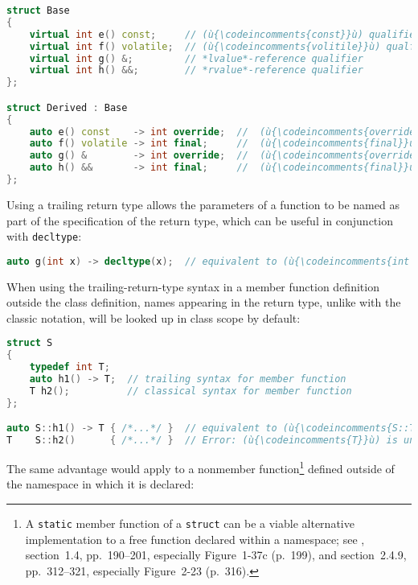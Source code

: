 \begin{lstlisting}[language=C++]
struct Base
{
    virtual int e() const;     // (ù{\codeincomments{const}}ù) qualifier
    virtual int f() volatile;  // (ù{\codeincomments{volitile}}ù) qualfier
    virtual int g() &;         // *lvalue*-reference qualifier
    virtual int h() &&;        // *rvalue*-reference qualifier
};

struct Derived : Base
{
    auto e() const    -> int override;  //  (ù{\codeincomments{override}}ù) contextual keyword
    auto f() volatile -> int final;     //  (ù{\codeincomments{final}}ù)         "        "
    auto g() &        -> int override;  //  (ù{\codeincomments{override}}ù)      "        "
    auto h() &&       -> int final;     //  (ù{\codeincomments{final}}ù)         "        "
};
\end{lstlisting}

\noindent Using a trailing return type allows the parameters of a function to be
named as part of the specification of the return type, which can be
useful in conjunction with \lstinline!decltype!:

\begin{lstlisting}[language=C++]
auto g(int x) -> decltype(x);  // equivalent to (ù{\codeincomments{int g(int x);}}ù)
\end{lstlisting}

\noindent When using the trailing-return-type syntax in a member function
definition outside the class definition, names appearing in the return
type, unlike with the classic notation, will be looked up in class scope
by default:

\begin{lstlisting}[language=C++]
struct S
{
    typedef int T;
    auto h1() -> T;  // trailing syntax for member function
    T h2();          // classical syntax for member function
};

auto S::h1() -> T { /*...*/ }  // equivalent to (ù{\codeincomments{S::T S::h1() \{ /\*...\*/ \}}}ù)
T    S::h2()      { /*...*/ }  // Error: (ù{\codeincomments{T}}ù) is unknown in this context.
\end{lstlisting}

\noindent The same advantage would apply to a nonmember
function{\cprotect\footnote{A \lstinline!static! member function of a
\lstinline!struct! can be a viable alternative implementation to a free
function declared within a namespace; see \cite{lakos20}, section~1.4,
pp.~190--201, especially Figure~1-37c (p.~199), and section~2.4.9, pp.~312--321, especially Figure~2-23 (p.~316).}} defined outside of the namespace in
which it is declared:

